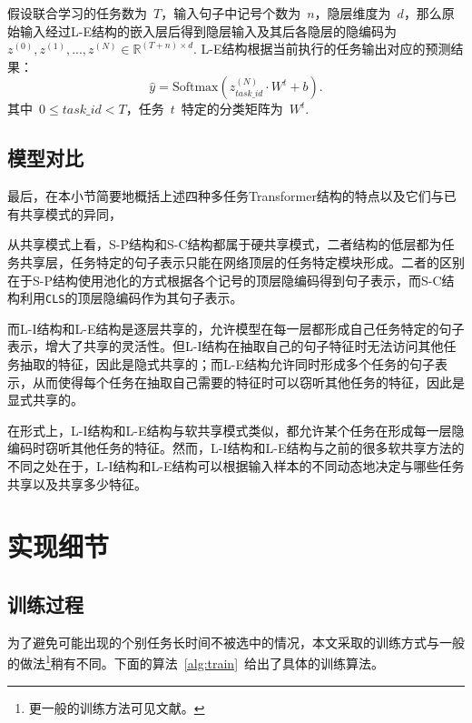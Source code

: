 假设联合学习的任务数为~$T$，输入句子中记号个数为~$n$，隐层维度为~$d$，那么原始输入经过L-E结构的嵌入层后得到隐层输入及其后各隐层的隐编码为~$z^{(0)}, z^{(1)}, ..., z^{(N)}\in \mathbb{R}^{(T+n)\times d}$. L-E结构根据当前执行的任务输出对应的预测结果：
\begin{equation}
	\hat{y} = \mathrm{Softmax}(z^{(N)}_{task\_id}\cdot W^{t} + b).
\end{equation}
其中~$0\le task\_id < T$，任务~$t$~特定的分类矩阵为~$W^t$.

\subsection{模型对比}
最后，在本小节简要地概括上述四种多任务Transformer结构的特点以及它们与已有共享模式的异同，

从共享模式上看，S-P结构和S-C结构都属于硬共享模式，二者结构的低层都为任务共享层，任务特定的句子表示只能在网络顶层的任务特定模块形成。二者的区别在于S-P结构使用池化的方式根据各个记号的顶层隐编码得到句子表示，而S-C结构利用\texttt{CLS}的顶层隐编码作为其句子表示。

而L-I结构和L-E结构是逐层共享的，允许模型在每一层都形成自己任务特定的句子表示，增大了共享的灵活性。但L-I结构在抽取自己的句子特征时无法访问其他任务抽取的特征，因此是隐式共享的；而L-E结构允许同时形成多个任务的句子表示，从而使得每个任务在抽取自己需要的特征时可以窃听其他任务的特征，因此是显式共享的。

在形式上，L-I结构和L-E结构与软共享模式类似，都允许某个任务在形成每一层隐编码时窃听其他任务的特征。然而，L-I结构和L-E结构与之前的很多软共享方法\cite{DBLP:conf/cvpr/MisraSGH16}\cite{1705.08142}的不同之处在于，L-I结构和L-E结构可以根据输入样本的不同动态地决定与哪些任务共享以及共享多少特征。

\section{实现细节}
\label{sec:imp}

\subsection{训练过程}
为了避免可能出现的个别任务长时间不被选中的情况，本文采取的训练方式与一般的做法\footnote{更一般的训练方法可见文献\cite{Caruana1997}。}稍有不同。下面的算法~\ref{alg:train}~给出了具体的训练算法。

